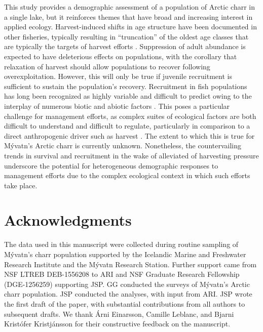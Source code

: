 \documentclass[11pt]{article}
\begin{document}
This study provides a demographic assessment of a population of Arctic charr in a single lake,
but it reinforces themes that have broad and increasing interest in applied ecology.
Harvest-induced shifts in age structure have been documented in other fisheries,
typically resulting in ``truncation'' of the oldest age classes 
that are typically the targets of harvest efforts
\citep{hsieh2010fishing}.
Suppression of adult abundance is expected to have deleterious effects on populations,
with the corollary that relaxation of harvest should allow populations 
to recover following overexploitation.
However, this will only be true if juvenile recruitment is sufficient 
to sustain the population's recovery.
Recruitment in fish populations 
has long been recognized as highly variable and difficult to predict
owing to the interplay of numerous biotic and abiotic factors 
\citep{dixon1999episodic, houde2008emerging, ludsin2014physical}.
This poses a particular challenge for management efforts, 
as complex suites of ecological factors are both difficult to understand 
and difficult to regulate, 
particularly in comparison to a direct anthropogenic driver such as harvest
\citep{beamish1999taking, link2002does}.
The extent to which this is true for M\'{y}vatn's Arctic charr is currently unknown.
Nonetheless, 
the countervailing trends in survival and recruitment 
in the wake of alleviated of harvesting pressure
underscore the potential for heterogeneous demographic responses to management efforts
due to the complex ecological context in which such efforts take place.






\section*{Acknowledgments} 

The data used in this manuscript were collected during routine sampling 
of M\'{y}vatn’s charr population supported by 
the Icelandic Marine and Freshwater Research Institute 
and the M\'{y}vatn Research Station. 
Further support came from NSF LTREB DEB-1556208 to ARI and 
NSF Graduate Research Fellowship (DGE-1256259) supporting JSP.
GG conducted the surveys of M\'{y}vatn’s Arctic charr population. 
JSP conducted the analyses, 
with input from ARI. 
JSP wrote the first draft of the paper, 
with substantial contributions from all authors to subsequent drafts.
We thank \'{A}rni Einarsson, Camille Leblanc, and Bjarni Krist\'{o}fer Kristj\'{a}nsson
for their constructive feedback on the manuscript.
\end{document}
